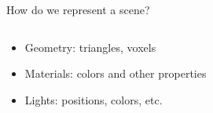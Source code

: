 \documentclass[10pt]{beamer}
\begin{document}
\begin{frame}{How do we represent a scene?}
  \begin{columns}
    \begin{column}{0.5\textwidth}
      \begin{itemize}[<+->]
        \item Geometry: triangles, voxels %
        \item Materials: colors and other properties %
        \item Lights: positions, colors, etc.
      \end{itemize}
    \end{column}
    \begin{column}{0.5\textwidth}


\end{column}
\end{columns}
\end{frame}
\end{document}
